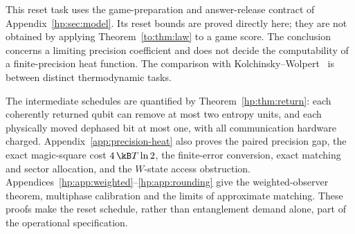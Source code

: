 This reset task uses the game-preparation and answer-release contract of Appendix~\ref{hp:sec:model}. Its reset bounds are proved directly here; they are not obtained by applying Theorem~\ref{to:thm:law} to a game score. The conclusion concerns a limiting precision coefficient and does not decide the computability of a finite-precision heat function. The comparison with Kolchinsky--Wolpert~\cite{HPKW20} is between distinct thermodynamic tasks.

The intermediate schedules are quantified by Theorem~\ref{hp:thm:return}: each coherently returned qubit can remove at most two entropy units, and each physically moved dephased bit at most one, with all communication hardware charged. Appendix~\ref{app:precision-heat} also proves the paired precision gap, the exact magic-square cost $4\,\kB T\ln2$, the finite-error conversion, exact matching and sector allocation, and the $W$-state access obstruction. Appendices~\ref{hp:app:weighted}--\ref{hp:app:rounding} give the weighted-observer theorem, multiphase calibration and the limits of approximate matching. These proofs make the reset schedule, rather than entanglement demand alone, part of the operational specification.
